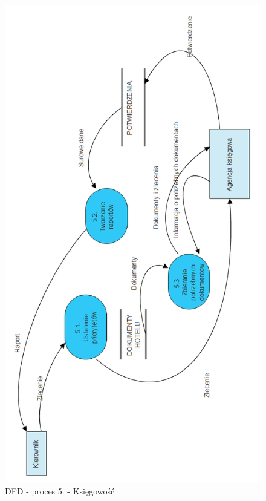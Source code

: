 \documentclass[a4paper, 11pt]{article}
\begin{document}
	\begin{figure}[H]%
			\center
			\includegraphics[scale=0.7]{Img/5.png}
			\caption{DFD - proces 5. - Księgowość}
	\end{figure}
\end{document}
